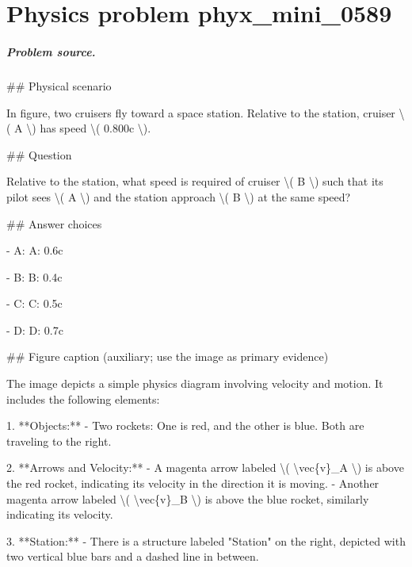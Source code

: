 
\chapter{Physics problem phyx\_mini\_0589}
\label{ch:PhyXMiniProblems_problem_phyx_mini_0589}

\paragraph{Problem source.}
\#\# Physical scenario

In figure, two cruisers fly toward a space station. Relative to the station, cruiser \textbackslash{}( A \textbackslash{}) has speed \textbackslash{}( 0.800c \textbackslash{}).

\#\# Question

Relative to the station, what speed is required of cruiser \textbackslash{}( B \textbackslash{}) such that its pilot sees \textbackslash{}( A \textbackslash{}) and the station approach \textbackslash{}( B \textbackslash{}) at the same speed?

\#\# Answer choices

- A: A: 0.6c

- B: B: 0.4c

- C: C: 0.5c

- D: D: 0.7c

\#\# Figure caption (auxiliary; use the image as primary evidence)

The image depicts a simple physics diagram involving velocity and motion. It includes the following elements:

1. **Objects:**
   - Two rockets: One is red, and the other is blue. Both are traveling to the right.
   
2. **Arrows and Velocity:**
   - A magenta arrow labeled \textbackslash{}( \textbackslash{}vec\{v\}\_A \textbackslash{}) is above the red rocket, indicating its velocity in the direction it is moving.
   - Another magenta arrow labeled \textbackslash{}( \textbackslash{}vec\{v\}\_B \textbackslash{}) is above the blue rocket, similarly indicating its velocity.

3. **Station:**
   - There is a structure labeled "Station" on the right, depicted with two vertical blue bars and a dashed line in between.

